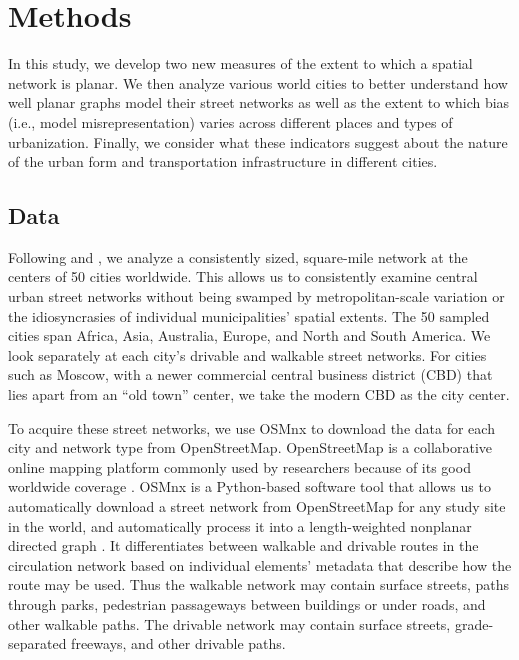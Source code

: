 \documentclass[Afour,sageh,times]{sagej}
\begin{document}
\section{Methods}

In this study, we develop two new measures of the extent to which a spatial network is planar. We then analyze various world cities to better understand how well planar graphs model their street networks as well as the extent to which bias (i.e., model misrepresentation) varies across different places and types of urbanization. Finally, we consider what these indicators suggest about the nature of the urban form and transportation infrastructure in different cities.

\subsection{Data}

Following \citet{jacobs_great_1995} and \citet{cardillo_structural_2006}, we analyze a consistently sized, square-mile network at the centers of 50 cities worldwide. This allows us to consistently examine central urban street networks without being swamped by metropolitan-scale variation or the idiosyncrasies of individual municipalities' spatial extents. The 50 sampled cities span Africa, Asia, Australia, Europe, and North and South America. We look separately at each city's drivable and walkable street networks. For cities such as Moscow, with a newer commercial central business district (CBD) that lies apart from an \enquote{old town} center, we take the modern CBD as the city center.

To acquire these street networks, we use OSMnx to download the data for each city and network type from OpenStreetMap. OpenStreetMap is a collaborative online mapping platform commonly used by researchers because of its good worldwide coverage \citep{haklay_how_2010,jokar_arsanjani_openstreetmap_2015}. OSMnx is a Python-based software tool that allows us to automatically download a street network from OpenStreetMap for any study site in the world, and automatically process it into a length-weighted nonplanar directed graph \citep{boeing_osmnx:_2017}. It differentiates between walkable and drivable routes in the circulation network based on individual elements' metadata that describe how the route may be used. Thus the walkable network may contain surface streets, paths through parks, pedestrian passageways between buildings or under roads, and other walkable paths. The drivable network may contain surface streets, grade-separated freeways, and other drivable paths.
\end{document}
